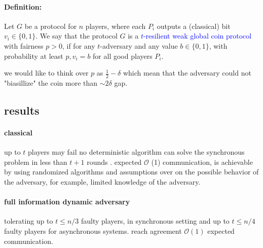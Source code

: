 \paragraph{Definition:} Let \(G\) be a protocol for \(n\) players, where each \( P_i\) outputs a (classical) bit \( v_i \in \{0,1\} \). We say that the protocol \( G \) is a \textcolor{blue}{\(t\)-resilient weak global coin protocol}  with fairness \( p > 0 \), if for any \(t\)-adversary and any value \(b\in \{0,1\}\), with probability at least \(p, v_i = b \) for all good players \(P_i \).

we would like to think over \( p \) as \( \frac{1}{2} - \delta \) which mean that the adversary could not "biasillize" the coin more than \( \sim 2 \delta \) gap.     

\subsection{results}

\paragraph{ classical } up to \( t \) players may fail no deterministic algorithm can solve the synchronous problem in less than \( t+ 1 \) rounds \cite{einstein}. expected \( \mathcal{O} \) (1) communication, is achievable by using randomized algorithms and assumptions over on the possible behavior of the adversary, for example, limited knowledge of the adversary.   

\paragraph{full information dynamic adversary } tolerating up to \( t \le n/3 \) faulty players, in synchronous setting and up to \( t \le n/4 \) faulty players for asynchronous systems. reach agreement \( \mathcal{ O } (1) \) expected communication.  

